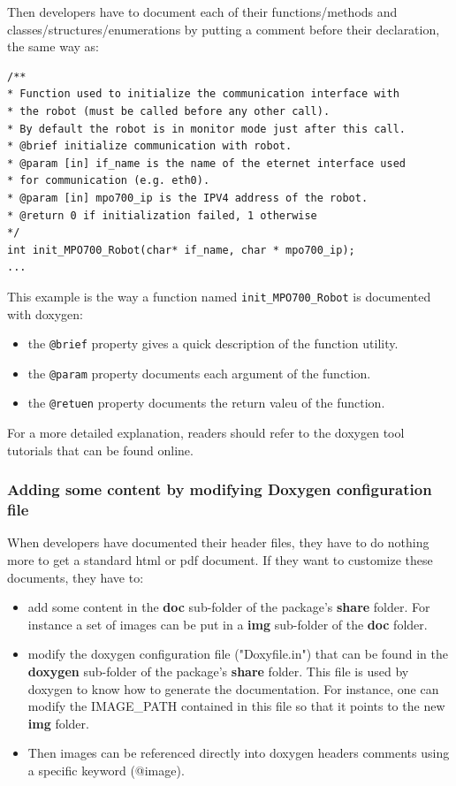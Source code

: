 \documentclass[12pt,a4paper]{article}
\begin{document}
Then developers have to document each of their functions/methods and classes/structures/enumerations by putting a comment before their declaration, the same way as:
\begin{verbatim}
/**
* Function used to initialize the communication interface with  
* the robot (must be called before any other call). 
* By default the robot is in monitor mode just after this call.
* @brief initialize communication with robot.
* @param [in] if_name is the name of the eternet interface used
* for communication (e.g. eth0).
* @param [in] mpo700_ip is the IPV4 address of the robot.
* @return 0 if initialization failed, 1 otherwise
*/
int init_MPO700_Robot(char* if_name, char * mpo700_ip);
...
\end{verbatim}

This example is the way a function named \texttt{init\_MPO700\_Robot} is documented with doxygen:
\begin{itemize}
\item the \texttt{@brief} property gives a quick description of the function utility.
\item the \texttt{@param} property documents each argument of the function.
\item the \texttt{@retuen} property documents the return valeu of the function.
\end{itemize}

For a more detailed explanation, readers should refer to the doxygen tool tutorials that can be found online. 

\subsubsection{Adding some content by modifying Doxygen configuration file}
\label{sec:apiCMakeDoxyfile}

When developers have documented their header files, they have to do nothing more to get a standard html or pdf document. If they want to customize these documents, they have to:
\begin{itemize}
\item add some content in the \textbf{doc} sub-folder of the package's \textbf{share} folder. For instance a set of images can be put in a \textbf{img} sub-folder of the \textbf{doc} folder. 
\item modify the doxygen configuration file ("Doxyfile.in") that can be found in the \textbf{doxygen} sub-folder of the package's \textbf{share} folder. This file is used by doxygen to know how to generate the documentation. For instance, one can modify the IMAGE\_PATH contained in this file so that it points to the new \textbf{img} folder.
\item Then images can be referenced directly into doxygen headers comments using a specific keyword (@image).
\end{itemize}
\end{document}
